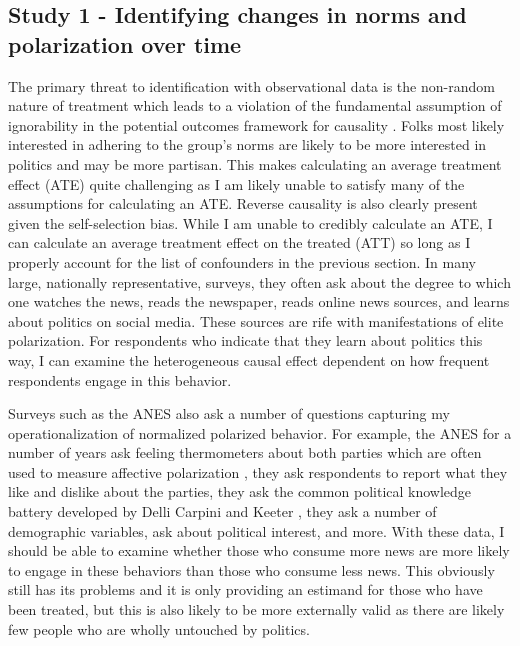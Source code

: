 \documentclass [12pt]{article}
\begin{document}
\subsection{Study 1 - Identifying changes in norms and polarization over time}

The primary threat to identification with observational data is the non-random nature of treatment which leads to a violation of the fundamental assumption of ignorability in the potential outcomes framework for causality \citep[see][]{morgan_winship_2014, cunningham_2020}. Folks most likely interested in adhering to the group's norms are likely to be more interested in politics and may be more partisan. This makes calculating an average treatment effect (ATE) quite challenging as I am likely unable to satisfy many of the assumptions for calculating an ATE. Reverse causality is also clearly present given the self-selection bias. While I am unable to credibly calculate an ATE, I can calculate an average treatment effect on the treated (ATT) so long as I properly account for the list of confounders in the previous section. In many large, nationally representative, surveys, they often ask about the degree to which one watches the news, reads the newspaper, reads online news sources, and learns about politics on social media. These sources are rife with manifestations of elite polarization. For respondents who indicate that they learn about politics this way, I can examine the heterogeneous causal effect dependent on how frequent respondents engage in this behavior.

Surveys such as the ANES also ask a number of questions capturing my operationalization of normalized polarized behavior. For example, the ANES for a number of years ask feeling thermometers about both parties which are often used to measure affective polarization \citep{iyengar_et-al_2012}, they ask respondents to report what they like and dislike about the parties, they ask the common political knowledge battery developed by Delli Carpini and Keeter \citeyearpar{delli-carpini_keeter_1996}, they ask a number of demographic variables, ask about political interest, and more. With these data, I should be able to examine whether those who consume more news are more likely to engage in these behaviors than those who consume less news. This obviously still has its problems and it is only providing an estimand for those who have been treated, but this is also likely to be more externally valid as there are likely few people who are wholly untouched by politics.
\end{document}
